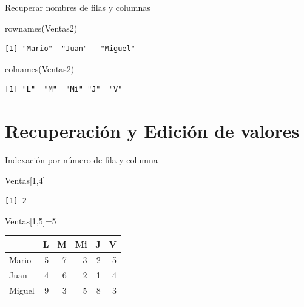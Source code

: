\documentclass[
  ignorenonframetext,
  aspectratio=169,
  spanish,
]{beamer}
\newenvironment{Shaded}{\begin{snugshade}}{\end{snugshade}}
\newcommand{\DecValTok}[1]{\textcolor[rgb]{0.68,0.00,0.00}{#1}}
\newcommand{\FunctionTok}[1]{\textcolor[rgb]{0.28,0.35,0.67}{#1}}
\newcommand{\NormalTok}[1]{\textcolor[rgb]{0.00,0.23,0.31}{#1}}
\newcommand{\OtherTok}[1]{\textcolor[rgb]{0.00,0.23,0.31}{#1}}
\begin{document}
\begin{frame}[fragile]{Recuperar nombres de filas y columnas}
\label{recuperar-nombres-de-filas-y-columnas}
\begin{Shaded}
\begin{Highlighting}[]
\FunctionTok{rownames}\NormalTok{(Ventas2)}
\end{Highlighting}
\end{Shaded}

\begin{verbatim}
[1] "Mario"  "Juan"   "Miguel"
\end{verbatim}

\begin{Shaded}
\begin{Highlighting}[]
\FunctionTok{colnames}\NormalTok{(Ventas2)}
\end{Highlighting}
\end{Shaded}

\begin{verbatim}
[1] "L"  "M"  "Mi" "J"  "V" 
\end{verbatim}
\end{frame}

\section{Recuperación y Edición de
valores}\label{recuperaciuxf3n-y-ediciuxf3n-de-valores}

\begin{frame}[fragile]{Indexación por número de fila y columna}
\label{indexaciuxf3n-por-nuxfamero-de-fila-y-columna}
\begin{Shaded}
\begin{Highlighting}[]
\NormalTok{Ventas[}\DecValTok{1}\NormalTok{,}\DecValTok{4}\NormalTok{]}
\end{Highlighting}
\end{Shaded}

\begin{verbatim}
[1] 2
\end{verbatim}

\begin{Shaded}
\begin{Highlighting}[]
\NormalTok{Ventas[}\DecValTok{1}\NormalTok{,}\DecValTok{5}\NormalTok{]}\OtherTok{=}\DecValTok{5}
\end{Highlighting}
\end{Shaded}

\begin{longtable}[]{@{}lrrrrr@{}}
\toprule\noalign{}
& L & M & Mi & J & V \\
\midrule\noalign{}
\endhead
Mario & 5 & 7 & 3 & 2 & 5 \\
Juan & 4 & 6 & 2 & 1 & 4 \\
Miguel & 9 & 3 & 5 & 8 & 3 \\
\bottomrule\noalign{}
\end{longtable}
\end{frame}
\end{document}
